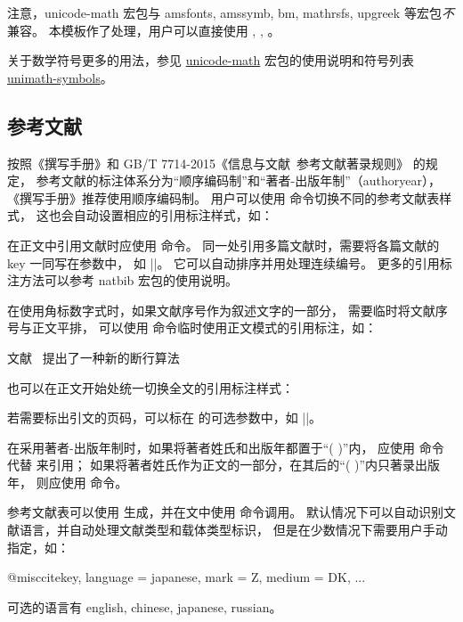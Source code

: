 \documentclass[a4paper]{ltxdoc}
\makeatletter
\DeclareRobustCommand\pkg{\textsf}
\def\DescribeOption{\leavevmode\@bsphack\begingroup\MakePrivateLetters
  \Describe@Option}
\def\Describe@Option#1{\endgroup
              \marginpar{\raggedleft\PrintDescribeOption{#1}}%
              \SpecialEnvIndex{#1}\@esphack\ignorespaces}
\makeatother
\begin{document}
注意，\pkg{unicode-math} 宏包与 \pkg{amsfonts}, \pkg{amssymb}, \pkg{bm},
\pkg{mathrsfs}, \pkg{upgreek} 等宏包\emph{不}兼容。
本模板作了处理，用户可以直接使用 , ,
。

关于数学符号更多的用法，参见
\href{http://mirrors.ctan.org/macros/latex/contrib/unicode-math/unicode-math.pdf}{\pkg{unicode-math}}
宏包的使用说明和符号列表
\href{http://mirrors.ctan.org/macros/latex/contrib/unicode-math/unimath-symbols.pdf}{\pkg{unimath-symbols}}。


\subsection{参考文献}

\DescribeMacro{}
按照《撰写手册》和 GB/T 7714-2015《信息与文献\ 参考文献著录规则》 的规定，
参考文献的标注体系分为“顺序编码制”和“著者-出版年制”（authoryear），
《撰写手册》推荐使用顺序编码制。
用户可以使用  命令切换不同的参考文献表样式，
这也会自动设置相应的引用标注样式，如：
\begin{latex}
  
\end{latex}

\DescribeMacro{\cite}
在正文中引用文献时应使用  命令。
同一处引用多篇文献时，需要将各篇文献的 key 一同写在参数中，
如 |\cite{knuth84,lamport94,mittelbach04}|。
它可以自动排序并用处理连续编号。
更多的引用标注方法可以参考 \pkg{natbib} 宏包的使用说明。

\DescribeMacro{\inlinecite}
\DescribeOption{cite-style}
在使用角标数字式时，如果文献序号作为叙述文字的一部分，
需要临时将文献序号与正文平排，
可以使用  命令临时使用正文模式的引用标注，如：
\begin{latex}
  文献~ 提出了一种新的断行算法
\end{latex}
也可以在正文开始处统一切换全文的引用标注样式：
\begin{latex}
  \xustsetup{}
    cite-style = inline,
  }
\end{latex}

若需要标出引文的页码，可以标在  的可选参数中，如 |\cite[42]{abc}|。

\DescribeMacro{\citep}
\DescribeMacro{\citet}
在采用著者-出版年制时，如果将著者姓氏和出版年都置于“( )”内，
应使用  命令代替  来引用；
如果将著者姓氏作为正文的一部分，在其后的“( )”内只著录出版年，
则应使用  命令。

\DescribeMacro{}
参考文献表可以使用 \BibTeX{} 生成，并在文中使用  命令调用。
\BibTeX{} 默认情况下可以自动识别文献语言，并自动处理文献类型和载体类型标识，
但是在少数情况下需要用户手动指定，如：
\begin{latex}
  @misc{citekey,
    language = {japanese},
    mark     = {Z},
    medium   = {DK},
    ...
  }
\end{latex}
可选的语言有 english, chinese, japanese, russian。
\end{document}
